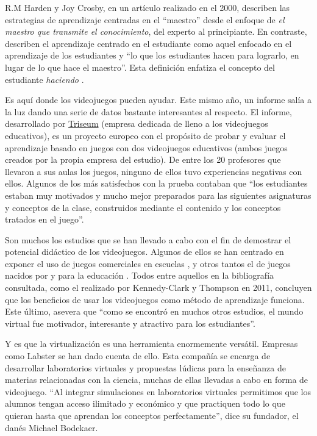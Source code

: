 R.M Harden y Joy Crosby, en un artículo realizado en el 2000, describen las estrategias de aprendizaje centradas en el ``maestro'' desde el enfoque de \textit{el maestro que transmite el conocimiento}, del experto al principiante. En contraste, describen el aprendizaje centrado en el estudiante como aquel enfocado en el aprendizaje de los estudiantes y ``lo que los estudiantes hacen para lograrlo, en lugar de lo que hace el maestro''. Esta definición enfatiza el concepto del estudiante \textit{haciendo} \cite{goodteacher}.

Es aquí donde los videojuegos pueden ayudar. Este mismo año, un informe salía a la luz dando una serie de datos bastante interesantes al respecto. El informe, desarrollado por \href{https://triseum.com/}{Triseum} (empresa dedicada de lleno a los videojuegos educativos), es un proyecto europeo con el propósito de probar y evaluar el aprendizaje basado en juegos con dos videojuegos educativos (ambos juegos creados por la propia empresa del estudio). De entre los 20 profesores que llevaron a sus aulas los juegos, ninguno de ellos tuvo experiencias negativas con ellos. Algunos de los más satisfechos con la prueba contaban que ``los estudiantes estaban muy motivados y mucho mejor preparados para las siguientes asignaturas y conceptos de la clase, construidos mediante el contenido y los conceptos tratados en el juego''\cite{triseum}.

Son muchos los estudios que se han llevado a cabo con el fin de demostrar el potencial didáctico de los videojuegos. Algunos de ellos se han centrado en exponer el uso de juegos comerciales en escuelas \cite{gamesinclass}, y otros tantos  el de juegos nacidos por y para la educación \cite{edugamesinclass}. Todos entre aquellos en la bibliografía consultada, como el realizado por Kennedy-Clark y Thompson en 2011, concluyen que los beneficios de usar los videojuegos como método de aprendizaje funciona. Este último, asevera que ``como se encontró en muchos otros estudios, el mundo virtual fue motivador, interesante y atractivo para los estudiantes''\cite{deathrome}.

Y es que la virtualización es una herramienta enormemente versátil. Empresas como Labster se han dado cuenta de ello. Esta compañía se encarga de desarrollar laboratorios virtuales y propuestas lúdicas para la enseñanza de materias relacionadas con la ciencia, muchas de ellas llevadas a cabo en forma de videojuego\cite{labster}. ``Al integrar simulaciones en laboratorios virtuales permitimos que los alumnos tengan acceso ilimitado y económico y que practiquen todo lo que quieran hasta que aprendan los conceptos perfectamente'', dice su fundador, el danés Michael Bodekaer.	

